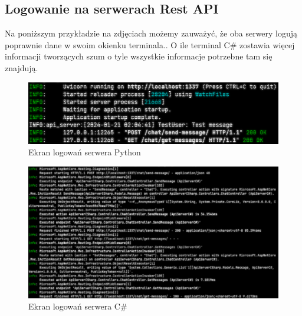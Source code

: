 \subsection{Logowanie na serwerach Rest API}
\begin{spacing}{1.5} %
    Na poniższym przykładzie na zdjęciach możemy zauważyć, że oba serwery logują poprawnie dane w swoim okienku terminala.. O ile terminal C\# zostawia więcej informacji tworzących szum o tyle wszystkie informacje potrzebne tam się znajdują.

    \begin{figure}[ht]
        \centering
        \noindent\hspace*{-2.1cm} %
        \includegraphics[width=1.2\textwidth]{assets/python_server_loging.png}
        \caption{Ekran logowań serwera Python}
        \label{fig:python_server_loging}
    \end{figure}


    \begin{figure}[ht]
        \centering
        \noindent\hspace*{-2.1cm} %
        \includegraphics[width=1.2\textwidth]{assets/csharp_server_loging.png}
        \caption{Ekran logowań serwera C\#}
        \label{fig:csharp_server_loging}
    \end{figure}
\end{spacing} %

